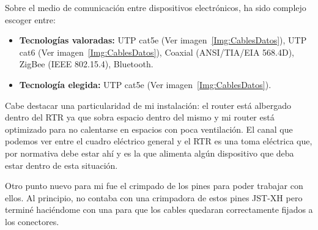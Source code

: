 Sobre el medio de comunicación entre dispositivos electrónicos, ha sido complejo escoger entre:
\begin{itemize}
    \item \textbf{Tecnologías valoradas:} UTP cat5e (Ver imagen~\ref{Img:CablesDatos}), UTP cat6 (Ver imagen~\ref{Img:CablesDatos}), Coaxial (ANSI/TIA/EIA 568.4D), ZigBee (IEEE 802.15.4), Bluetooth\cite{manual:IEEE802.11}. 
    \item \textbf{Tecnología elegida:} UTP cat5e (Ver imagen~\ref{Img:CablesDatos}).
\end{itemize}

Cabe destacar una particularidad de mi instalación: el router está albergado dentro del RTR ya que sobra espacio dentro del mismo y mi router está optimizado para no calentarse en espacios con poca ventilación. El canal que podemos ver entre el cuadro eléctrico general y el RTR es una toma eléctrica que, por normativa debe estar ahí y es la que alimenta algún dispositivo que deba estar dentro de esta situación.

Otro punto nuevo para mi fue el crimpado de los pines para poder trabajar con ellos. Al principio, no contaba con una crimpadora de estos pines JST-XH pero terminé haciéndome con una para que los cables quedaran correctamente fijados a los conectores.

